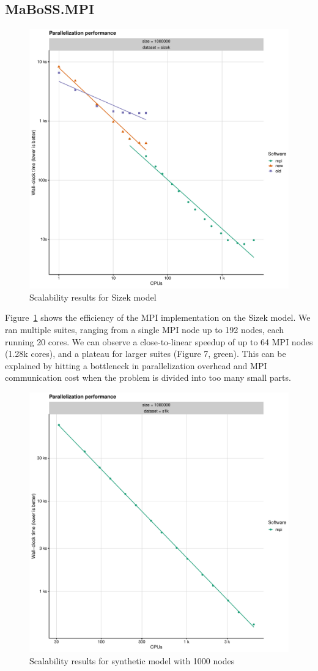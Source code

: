 \documentclass[times, twoside]{zHenriquesLab-StyleBioRxiv}
\begin{document}
\subsection*{MaBoSS.MPI}

\begin{figure}%
\centering
\includegraphics[width=.8\linewidth]{Figures/sizek_model.pdf}
\caption{Scalability results for Sizek model}
\label{fig:sizek_results}
\end{figure}

Figure~\ref{fig:sizek_results} shows the efficiency of the MPI implementation on the Sizek model. We ran multiple suites, ranging from a single MPI node up to 192 nodes, each running 20 cores. We can observe a close-to-linear speedup of up to 64 MPI nodes (1.28k cores), and a plateau for larger suites (Figure 7, green). This can be explained by hitting a bottleneck in parallelization overhead and MPI communication cost when the problem is divided into too many small parts.

\begin{figure}%
\centering
\includegraphics[width=.8\linewidth]{Figures/large_model.pdf}
\caption{Scalability results for synthetic model with 1000 nodes}
\label{fig:synthetic_results}
\end{figure}
\end{document}
